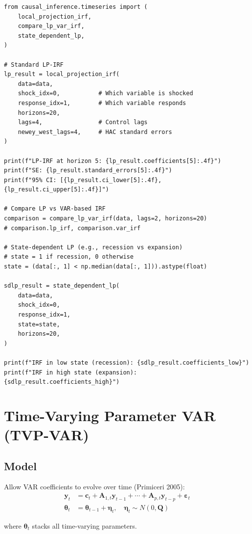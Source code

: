\begin{verbatim}
from causal_inference.timeseries import (
    local_projection_irf,
    compare_lp_var_irf,
    state_dependent_lp,
)

# Standard LP-IRF
lp_result = local_projection_irf(
    data=data,
    shock_idx=0,           # Which variable is shocked
    response_idx=1,        # Which variable responds
    horizons=20,
    lags=4,                # Control lags
    newey_west_lags=4,     # HAC standard errors
)

print(f"LP-IRF at horizon 5: {lp_result.coefficients[5]:.4f}")
print(f"SE: {lp_result.standard_errors[5]:.4f}")
print(f"95% CI: [{lp_result.ci_lower[5]:.4f}, {lp_result.ci_upper[5]:.4f}]")

# Compare LP vs VAR-based IRF
comparison = compare_lp_var_irf(data, lags=2, horizons=20)
# comparison.lp_irf, comparison.var_irf

# State-dependent LP (e.g., recession vs expansion)
# state = 1 if recession, 0 otherwise
state = (data[:, 1] < np.median(data[:, 1])).astype(float)

sdlp_result = state_dependent_lp(
    data=data,
    shock_idx=0,
    response_idx=1,
    state=state,
    horizons=20,
)

print(f"IRF in low state (recession): {sdlp_result.coefficients_low}")
print(f"IRF in high state (expansion): {sdlp_result.coefficients_high}")
\end{verbatim}


\section{Time-Varying Parameter VAR (TVP-VAR)}

\subsection{Model}

Allow VAR coefficients to evolve over time (Primiceri 2005):
\begin{align}
\mathbf{y}_t &= \mathbf{c}_t + \mathbf{A}_{1,t} \mathbf{y}_{t-1} + \cdots + \mathbf{A}_{p,t} \mathbf{y}_{t-p} + \boldsymbol{\varepsilon}_t \\
\boldsymbol{\theta}_t &= \boldsymbol{\theta}_{t-1} + \boldsymbol{\eta}_t, \quad \boldsymbol{\eta}_t \sim N(0, \mathbf{Q})
\end{align}

where $\boldsymbol{\theta}_t$ stacks all time-varying parameters.

